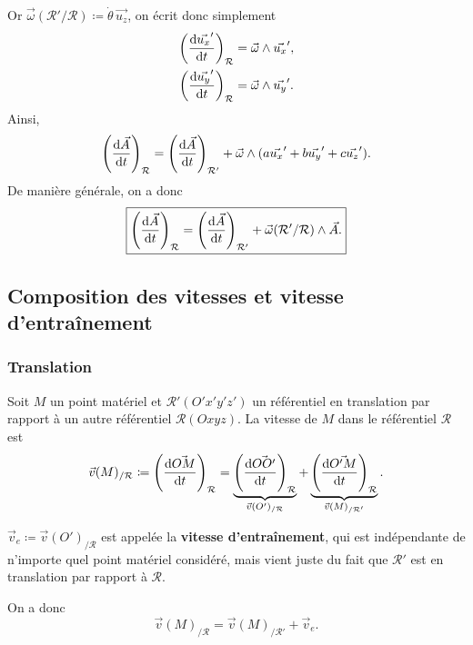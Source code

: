         Or $\vec{\omega}(\mathcal{R}'/\mathcal{R})\coloneqq\dot{\theta}\,\vec{u_z}$, on écrit donc simplement
        \begin{equation*}
            \begin{aligned}
                \left(\frac{\mathrm{d}\vec{u_x}'}{\mathrm{d} t}\right)_{\mathcal{R}} &=\vec{\omega}\wedge\vec{u_x}',\\
                \left(\frac{\mathrm{d}\vec{u_y}'}{\mathrm{d} t}\right)_{\mathcal{R}} &=\vec{\omega}\wedge\vec{u_y}'.
            \end{aligned}
        \end{equation*}
        Ainsi,
        \begin{equation*}
            \left(\frac{\mathrm{d}\vec{A}}{\mathrm{d} t}\right)_{\mathcal{R}}=\left(\frac{\mathrm{d}\vec{A}}{\mathrm{d} t}\right)_{\mathcal{R}'}+\vec{\omega}\wedge(a\vec{u_x}'+b\vec{u_y}'+c\vec{u_z}').
        \end{equation*}
        De manière générale, on a donc 
        \begin{equation*}
            \boxed{
                \left(\frac{\mathrm{d}\vec{A}}{\mathrm{d} t}\right)_{\mathcal{R}}=\left(\frac{\mathrm{d}\vec{A}}{\mathrm{d} t}\right)_{\mathcal{R}'}+\vec{\omega}(\mathcal{R}'/\mathcal{R})\wedge\vec{A}.
            }
        \end{equation*}
    
    \subsection{Composition des vitesses et vitesse d'entraînement}
        \subsubsection{Translation}

            Soit $M$ un point matériel et $\mathcal{R}'(O'x'y'z')$ un référentiel en translation par rapport à un autre référentiel $\mathcal{R}(Oxyz)$. La vitesse de $M$ dans le référentiel $\mathcal{R}$ est
            \begin{equation*}
                \vec{v}(M)_{/\mathcal{R}}\coloneqq\left(\frac{\mathrm{d}\vec{OM}}{\mathrm{d} t}\right)_{\mathcal{R}}=\underbrace{\left(\frac{\mathrm{d} \vec{OO'}}{\mathrm{d} t}\right)_{\mathcal{R}}}_{\vec{v}(O')_{/\mathcal{R}}}+\underbrace{\left(\frac{\mathrm{d}\vec{O'M}}{\mathrm{d} t}\right)_{\mathcal{R}}}_{\vec{v}(M)_{/\mathcal{R}'}}.
            \end{equation*}
            \begin{definition}
                $\vec{v}_e\coloneqq\vec{v}(O')_{/\mathcal{R}}$ est appelée la \textbf{vitesse d'entraînement}, qui est indépendante de n'importe quel point matériel considéré, mais vient juste du fait que $\mathcal{R}'$ est en translation par rapport à $\mathcal{R}$.
            \end{definition}
            On a donc
            \begin{equation*}
                \boxed{
                    \vec{v}(M)_{/\mathcal{R}}=\vec{v}(M)_{/\mathcal{R}'}+\vec{v}_e.
                }
            \end{equation*}

